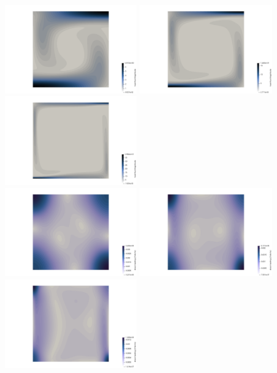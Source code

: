 \begin{center}
\includegraphics[width=5.7cm]{python_codes/fieldstone_110/results_EBA/q_1e4}
\includegraphics[width=5.7cm]{python_codes/fieldstone_110/results_EBA/q_1e5}
\includegraphics[width=5.7cm]{python_codes/fieldstone_110/results_EBA/q_1e6}\\
\includegraphics[width=5.7cm]{python_codes/fieldstone_110/results_EBA/sh_1e4}
\includegraphics[width=5.7cm]{python_codes/fieldstone_110/results_EBA/sh_1e5}
\includegraphics[width=5.7cm]{python_codes/fieldstone_110/results_EBA/sh_1e6}\\

\end{center}

